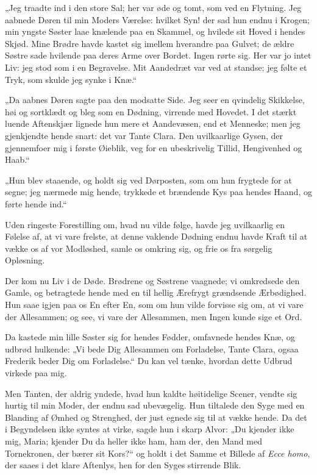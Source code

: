 \documentclass[12pt,a4paper]{book}
\newcommand{\apage}[1]{\marginnote{\footnotesize\textit{[#1]}}}
\begin{document}
„Jeg traadte ind i den store Sal; her var øde og tomt, som ved en Flytning. Jeg aabnede Døren til min Moders Værelse: hvilket Syn! der sad hun endnu i Krogen; min yngste Søster laae knælende paa en Skammel, og hvilede sit Hoved i hendes Skjød. Mine Brødre havde kastet sig imellem hverandre paa Gulvet; de ældre Søstre sade hvilende paa deres Arme over Bordet. Ingen rørte sig. Her var jo intet Liv: jeg stod som i en Begravelse. Mit Aandedræt var ved at standse; jeg følte et Tryk, som skulde jeg synke i Knæ.“

„Da aabnes Døren sagte paa den modsatte Side. Jeg seer en qvindelig Skikkelse, høi og sortklædt og bleg som en Dødning, virrende med Hovedet. I det stærkt luende Aftenskjær lignede hun mere et Aandevæsen, end et Menneske; men jeg gjenkjendte hende snart: det var Tante Clara. Den uvilkaarlige Gysen, der gjennemfoer mig i første Øieblik, veg for en ubeskrivelig Tillid, Hengivenhed og Haab.“

„Hun blev staaende, og holdt sig ved Dørposten, som om hun frygtede for at segne; jeg nærmede mig hende, trykkede et brændende Kys paa hendes Haand, og førte hende \apage{78} ind.“

Uden ringeste Forestilling om, hvad nu vilde følge, havde jeg uvilkaarlig en Følelse af, at vi vare frelste, at denne vaklende Dødning endnu havde Kraft til at vække os af vor Modløshed, samle os omkring sig, og frie os fra sørgelig Opløsning.

Der kom nu Liv i de Døde. Brødrene og Søstrene vaagnede; vi omkredsede den Gamle, og betragtede hende med en til hellig Ærefrygt grændsende Ærbødighed. Hun saae igjen paa os En efter En, som om hun vilde forvisse sig om, at vi vare der Allesammen; og see, vi vare der Allesammen, men Ingen kunde sige et Ord.

Da kastede min lille Søster sig for hendes Fødder, omfavnede hendes Knæ, og udbrød hulkende: „Vi bede Dig Allesammen om Forladelse, Tante Clara, ogsaa Frederik beder Dig om Forladelse.“ Du kan vel tænke, hvordan dette Udbrud virkede paa mig.

Men Tanten, der aldrig yndede, hvad hun kaldte høitidelige Scener, vendte sig hurtig til min Moder, der endnu sad ubevægelig. Hun tiltalede den Syge med en Blanding af Ømhed og Strenghed, der just egnede sig til at vække hende. Da det i Begyndelsen ikke syntes at virke, sagde hun i skarp Alvor: „Du kjender ikke mig, Maria; kjender Du da heller ikke ham, ham der, den Mand med Tornekronen, der bærer sit Kors?“ og holdt i det Samme et Billede af \textit{Ecce homo}, der saaes i det klare Aftenlys, hen for den Syges stirrende Blik.
\end{document}
